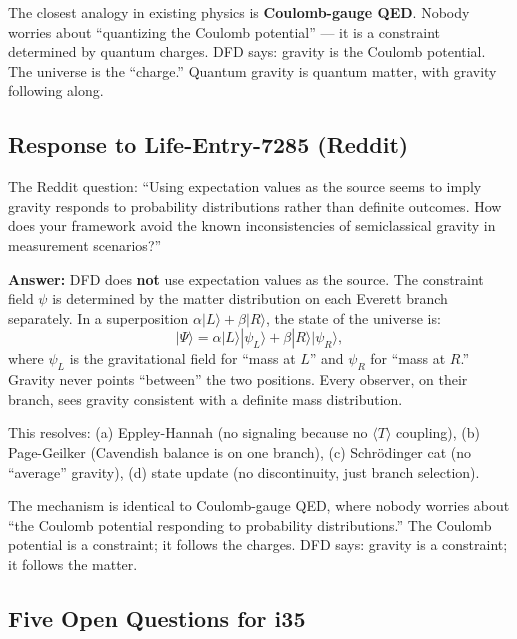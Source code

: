 \documentclass[11pt,a4paper]{article}
\begin{document}
The closest analogy in existing physics is \textbf{Coulomb-gauge QED}. Nobody worries about ``quantizing the Coulomb potential'' --- it is a constraint determined by quantum charges. DFD says: gravity is the Coulomb potential. The universe is the ``charge.'' Quantum gravity is quantum matter, with gravity following along.

\subsection{Response to Life-Entry-7285 (Reddit)}

The Reddit question: ``Using expectation values as the source seems to imply gravity responds to probability distributions rather than definite outcomes. How does your framework avoid the known inconsistencies of semiclassical gravity in measurement scenarios?''

\textbf{Answer:} DFD does \textbf{not} use expectation values as the source. The constraint field $\psi$ is determined by the matter distribution on each Everett branch separately. In a superposition $\alpha|L\rangle + \beta|R\rangle$, the state of the universe is:
\begin{equation}
|\Psi\rangle = \alpha|L\rangle|\psi_L\rangle + \beta|R\rangle|\psi_R\rangle,
\end{equation}
where $\psi_L$ is the gravitational field for ``mass at $L$'' and $\psi_R$ for ``mass at $R$.'' Gravity never points ``between'' the two positions. Every observer, on their branch, sees gravity consistent with a definite mass distribution.

This resolves: (a) Eppley-Hannah (no signaling because no $\langle T\rangle$ coupling), (b) Page-Geilker (Cavendish balance is on one branch), (c) Schr\"odinger cat (no ``average'' gravity), (d) state update (no discontinuity, just branch selection).

The mechanism is identical to Coulomb-gauge QED, where nobody worries about ``the Coulomb potential responding to probability distributions.'' The Coulomb potential is a constraint; it follows the charges. DFD says: gravity is a constraint; it follows the matter.

\subsection{Five Open Questions for i35}
\end{document}
